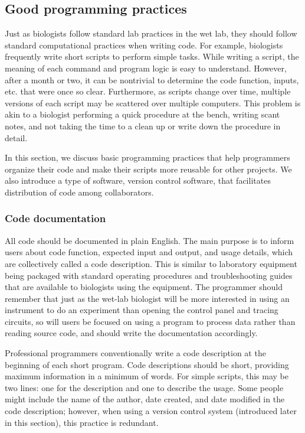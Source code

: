\documentclass[ChapterTOCs,krantz2]{krantz} %
\begin{document}
\subsection{Good programming practices}

Just as biologists follow standard lab practices in the wet lab, they
should follow standard computational practices when writing code.
For example, biologists frequently write short scripts to perform
simple tasks. While writing a script, the 
meaning of each command and program logic 
is easy to understand.  However, after a month or two, it can be
nontrivial to determine the code function, inputs, etc. that were once
so clear.
Furthermore, as scripts change over time, multiple versions of each script may be scattered 
over multiple computers. This problem is akin to a biologist performing a
quick procedure at the bench, writing scant notes, and not taking the time to a clean up or write down the procedure in detail.

In this section, we discuss basic programming
practices that help programmers organize their code and make their
scripts more reusable for other projects. We also introduce a type of
software, version control software, that facilitates
distribution of code among collaborators.


\subsubsection{Code documentation} 
All code should be documented in plain English.  
The main purpose is to inform users about code function, expected input
and output, and usage details, which are collectively called
a code description. This is
similar to laboratory equipment being packaged with standard operating
procedures and troubleshooting guides that are available to biologists
using the equipment.  The programmer should remember that just as the
wet-lab biologist will be more interested in using an instrument to do an
experiment than opening the control panel and tracing circuits, so will users
be focused on using a program to process data rather than reading
source code, and should write the documentation accordingly. 

Professional programmers conventionally write a code description at the
beginning of each short program.  Code descriptions should be short, 
providing maximum information in a
minimum of words.  For simple scripts, this may be two lines: one for the
description and one to describe the usage.  Some people might include the
name of the author, date created, and date modified in the code description;
however, when using a version control system (introduced later in this
section), this practice is redundant.  
\end{document}
